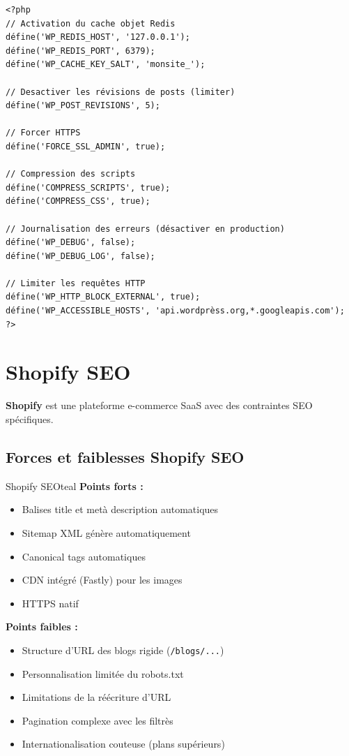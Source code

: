 \documentclass[12pt,a4paper,twoside]{report}
\newcommand{\keyword}[1]{\textbf{\textcolor{googleblue}{#1}}}
\begin{document}
\begin{lstlisting}[style=code,caption={Configuration wp-config.php pour les performances SEO}]
<?php
// Activation du cache objet Redis
défine('WP_REDIS_HOST', '127.0.0.1');
défine('WP_REDIS_PORT', 6379);
défine('WP_CACHE_KEY_SALT', 'monsite_');

// Desactiver les révisions de posts (limiter)
défine('WP_POST_REVISIONS', 5);

// Forcer HTTPS
défine('FORCE_SSL_ADMIN', true);

// Compression des scripts
défine('COMPRESS_SCRIPTS', true);
défine('COMPRESS_CSS', true);

// Journalisation des erreurs (désactiver en production)
défine('WP_DEBUG', false);
défine('WP_DEBUG_LOG', false);

// Limiter les requêtes HTTP
défine('WP_HTTP_BLOCK_EXTERNAL', true);
défine('WP_ACCESSIBLE_HOSTS', 'api.wordprèss.org,*.googleapis.com');
?>
\end{lstlisting}

\section{Shopify SEO}

\keyword{Shopify} est une plateforme e-commerce SaaS avec des contraintes SEO spécifiques.

\subsection{Forces et faiblesses Shopify SEO}

\begin{mybox}{Shopify SEO}{teal}
\textbf{Points forts :}
\begin{itemize}
    \item Balises title et metà description automatiques
    \item Sitemap XML génère automatiquement
    \item Canonical tags automatiques
    \item CDN intégré (Fastly) pour les images
    \item HTTPS natif
\end{itemize}
\textbf{Points faibles :}
\begin{itemize}
    \item Structure d'URL des blogs rigide (\texttt{/blogs/...})
    \item Personnalisation limitée du robots.txt
    \item Limitations de la réécriture d'URL
    \item Pagination complexe avec les filtrès
    \item Internationalisation couteuse (plans supérieurs)
\end{itemize}
\end{mybox}
\end{document}
